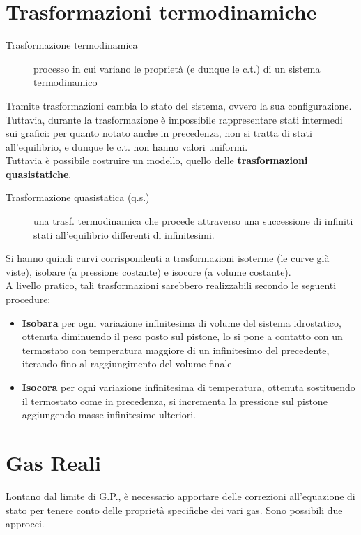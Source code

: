 \documentclass[10pt, oneside]{book}
\begin{document}
\section{Trasformazioni termodinamiche}
\begin{description}
\item[Trasformazione termodinamica] processo in cui variano le proprietà (e dunque le c.t.) di un sistema termodinamico
\end{description}
Tramite trasformazioni cambia lo stato del sistema, ovvero la sua configurazione. Tuttavia, durante la trasformazione è impossibile rappresentare stati intermedi sui grafici: per quanto notato anche in precedenza, non si tratta di stati all'equilibrio, e dunque le c.t. non hanno valori uniformi.
\\Tuttavia è possibile costruire un modello, quello delle \textbf{trasformazioni quasistatiche}.
\begin{description}
\item[Trasformazione quasistatica (q.s.)] una trasf. termodinamica che procede attraverso una successione di infiniti stati all'equilibrio differenti di infinitesimi.
\end{description}
Si hanno quindi curvi corrispondenti a trasformazioni isoterme (le curve già viste), isobare (a pressione costante) e isocore (a volume costante).
\\A livello pratico, tali trasformazioni sarebbero realizzabili secondo le seguenti procedure:
\begin{itemize}
\item \textbf{Isobara} per ogni variazione infinitesima di volume del sistema idrostatico, ottenuta diminuendo il peso posto sul pistone, lo si pone a contatto con un termostato con temperatura maggiore di un infinitesimo del precedente, iterando fino al raggiungimento del volume finale
\item \textbf{Isocora} per ogni variazione infinitesima di temperatura, ottenuta sostituendo il termostato come in precedenza, si incrementa la pressione sul pistone aggiungendo masse infinitesime ulteriori.
\end{itemize}

\section{Gas Reali}
Lontano dal limite di G.P., è necessario apportare delle correzioni all'equazione di stato per tenere conto delle proprietà specifiche dei vari gas. Sono possibili due approcci. 
\end{document}
